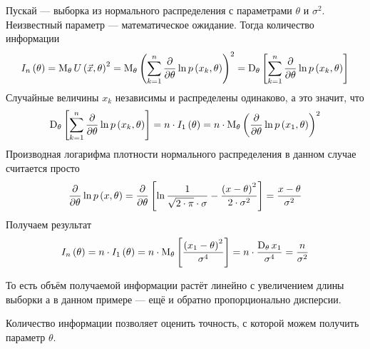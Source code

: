 \begin{example}
  Пускай \xsample --- выборка из нормального распределения с
  параметрами $\theta$ и $\sigma^2$.
  Неизвестный параметр --- математическое ожидание.
  Тогда количество информации
  \begin{equation*}
    I_n\left( \theta \right)
    = \operatorname{M}_{\theta} U\left( \vec{x}, \theta \right)^2
    = \operatorname{M}_{\theta} \left( \sum_{k=1}^{n} \frac{\partial}{\partial\theta}
      \ln{p\left(x_k, \theta\right)} \right)^2
    = \operatorname{D}_{\theta} \left[ \sum_{k=1}^{n} \frac{\partial}{\partial\theta}
      \ln{p\left(x_k, \theta\right)} \right]
  \end{equation*}
  Случайные величины $x_k$ независимы и распределены одинаково, а это значит,
  что
  \begin{equation*}
    \operatorname{D}_{\theta} \left[ \sum_{k=1}^{n} \frac{\partial}{\partial\theta}
      \ln{p\left(x_k, \theta\right)} \right]
    = n \cdot I_1\left( \theta \right)
    = n \cdot \operatorname{M}_{\theta} \left( \frac{\partial}{\partial \theta}
      \ln{p\left(x_1, \theta\right)} \right)^2
  \end{equation*}
  Производная логарифма плотности нормального распределения в данном случае
  считается просто
  \begin{equation*}
    \frac{\partial}{\partial \theta} \ln{p\left(x, \theta\right)}
    = \frac{\partial}{\partial \theta} \left[
        \ln{\frac{1}{\sqrt{2 \cdot \pi} \cdot \sigma}}
        - \frac{\left( x - \theta \right)^2}{2 \cdot \sigma^2} \right]
    = \frac{x - \theta}{\sigma^2}
  \end{equation*}
  Получаем результат
  \begin{equation*}
    I_n\left( \theta \right) = n \cdot I_1\left( \theta \right)
    = n \cdot \operatorname{M}_{\theta} \left[ \frac{\left( x_1 - \theta \right)^2}{\sigma^4} \right]
    = n \cdot \frac{\operatorname{D}_{\theta} x_1}{\sigma^4}
    = \frac{n}{\sigma^2}
  \end{equation*}

  То есть объём получаемой информации растёт линейно с увеличением длины
  выборки а в данном примере --- ещё и обратно пропорционально дисперсии.
\end{example}

Количество информации позволяет оценить точность,
с которой можем получить параметр $\theta$.

